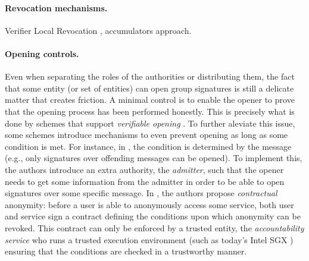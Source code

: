 \paragraph{Revocation mechanisms.}
Verifier Local Revocation \cite{bs04}, accumulators approach.

\paragraph{Opening controls.}
Even when separating the roles of the authorities or distributing them, the
fact that some entity (or set of entities) can open group signatures is still
a delicate matter that creates friction. A minimal control is to enable the
opener to prove that the opening process has been performed honestly. This is
precisely what is done by schemes that support \emph{verifiable opening}
\needcite. To further aleviate this issue, some schemes
introduce mechanisms to even prevent opening as long as some condition is
met. For instance, in \cite{seh+12,ehk+19}, the condition is determined by
the message (e.g., only signatures over offending messages can be opened).
To implement this, the authors introduce an extra authority, the
\emph{admitter}, such that the opener needs to get some information from the
admitter in order to be able to open signatures over some specific message.
In \cite{sbm10}, the authors propose \emph{contractual} anonymity: before a user
is able to anonymously access some service, both user and service sign a
contract defining the conditions upon which anonymity can be revoked. This
contract can only be enforced by a trusted entity, the \emph{accountability
  service} who runs a trusted execution environment (such as today's Intel
SGX \needcite) ensuring that the conditions are checked in a trustworthy manner.

